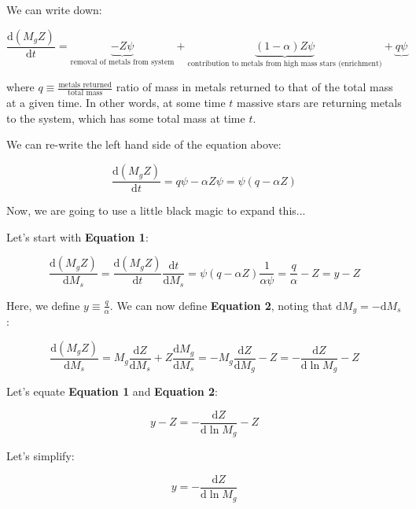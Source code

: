 \documentclass{article}
\begin{document}
We can write down:

\begin{equation}
    \frac{\mathrm{d}\left(M_g Z\right)}{\mathrm{d}t} = \underbrace{-Z \psi}_\text{removal of metals from system} + \underbrace{\left(1-\alpha\right) Z\psi}_\text{contribution to metals from high mass stars (enrichment)} + \underbrace{q \psi}_\text{}
\end{equation}

where $q \equiv \frac{\text{metals returned}}{\text{total mass}}$ ratio of mass in metals returned to that of the total mass at a given time. In other words, at some time $t$ massive stars are returning metals to the system, which has some total mass at time $t$.

We can re-write the left hand side of the equation above:

\begin{equation}
    \frac{\mathrm{d}\left(M_g Z\right)}{\mathrm{d}t} = q\psi - \alpha Z\psi = \psi\left(q-\alpha Z\right)
\end{equation}

Now, we are going to use a little black magic to expand this...

Let's start with \textbf{Equation 1}:

\begin{equation}
    \frac{\mathrm{d}\left(M_g Z\right)}{\mathrm{d}M_s} = \frac{\mathrm{d}\left(M_g Z\right)}{\mathrm{d}t} \frac{\mathrm{d}t}{\mathrm{d}M_{s}} = \psi(q-\alpha Z)\frac{1}{\alpha \psi} = \frac{q}{\alpha} - Z = y-Z
\end{equation}

Here, we define $y\equiv \frac{q}{\alpha}$. We can now define \textbf{Equation 2}, noting that $\mathrm{d}M_g = - \mathrm{d}M_s$:

\begin{equation}
    \frac{\mathrm{d}\left(M_g Z\right)}{\mathrm{d}M_s} = M_g \frac{\mathrm{d} Z}{\mathrm{d} M_{s}} + Z \frac{\mathrm{d}M_{g}}{\mathrm{d}M_s} = -M_g \frac{\mathrm{d}Z}{\mathrm{d}M_g} - Z = - \frac{\mathrm{d}Z}{\mathrm{d}\ln{M_g}} - Z
\end{equation}


Let's equate \textbf{Equation 1} and \textbf{Equation 2}:

\begin{equation}
    y-Z = - \frac{\mathrm{d}Z}{\mathrm{d}\ln{M_g}} - Z
\end{equation}

Let's simplify:

\begin{equation}
    y = - \frac{\mathrm{d}Z}{\mathrm{d}\ln{M_g}}
\end{equation}
\end{document}
